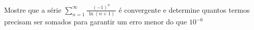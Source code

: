 \documentclass[a4paper,12pt,fleqn]{article}
\begin{document}
Mostre que a série \;
\(
  \sum_{n=1}^\infty \frac{(-1)^n}{\,\ln(n+1)\,}
\) \;
é convergente e determine quantos termos precisam ser somados
para garantir um erro menor do que $10^{-6}$


\end{document}
